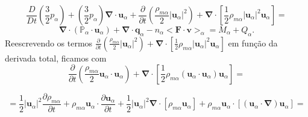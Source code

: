 \documentclass[12pt,oneside,a4paper]{abntex2}
\begin{document}
\begin{equation}
\label{eq: p5.1}
\frac{D}{Dt} \left( \frac{3}{2}p_\alpha \right) + \left(\frac{3}{2}p_\alpha \right)  \bm{\nabla} \cdot \bm{u}_\alpha +  \frac{\partial }{\partial t} \left(\frac{\rho_{m\alpha}}{2} |\bm{u}_\alpha|^2 \right) +\bm{\nabla} \cdot \left[ \frac{1}{2}\rho_{m\alpha}|\bm{u}_\alpha|^2 \bm{u}_\alpha \right] = 
\end{equation}
\begin{equation*}
\bm{\nabla} \cdot (\mathbb{P}_\alpha \cdot \bm{u}_\alpha) + \bm{\nabla} \cdot \bm{q}_\alpha-n_\alpha <\bm{F} \cdot \bm{v}>_\alpha = M_\alpha +Q_\alpha.
\end{equation*}
Reescrevendo os termos $\frac{\partial }{\partial t} \left(\frac{\rho_{m\alpha}}{2} |\bm{u}_\alpha|^2 \right) +\bm{\nabla} \cdot \left[ \frac{1}{2}\rho_{m\alpha}|\bm{u}_\alpha|^2 \bm{u}_ \alpha \right]$ em função da derivada total, ficamos com
\begin{equation}
\frac{\partial }{\partial t} \left(\frac{\rho_{m\alpha}}{2}\bm{u}_\alpha \cdot \bm{u}_\alpha \right) +\bm{\nabla} \cdot \left[ \frac{1}{2}\rho_{m\alpha}(\bm{u}_\alpha \cdot \bm{u}_ \alpha) \bm{u}_\alpha \right] = 
\end{equation}

\begin{equation*}
= \frac{1}{2}|\bm{u}_\alpha|^2 \frac{\partial \rho_{m\alpha} }{\partial t} + \rho_{m\alpha} \bm{u}_\alpha \cdot \frac{\partial \bm{u}_\alpha}{\partial t} +
\frac{1}{2}|\bm{u}_\alpha|^2 \bm{\nabla} \cdot \left[ \rho_{m\alpha}  \bm{u}_\alpha \right] + \rho_{m\alpha}  \bm{u}_\alpha  \cdot \left[ (\bm{u}_\alpha \cdot \bm{\nabla} )\bm{u}_\alpha  \right] = 
\end{equation*}
\end{document}
